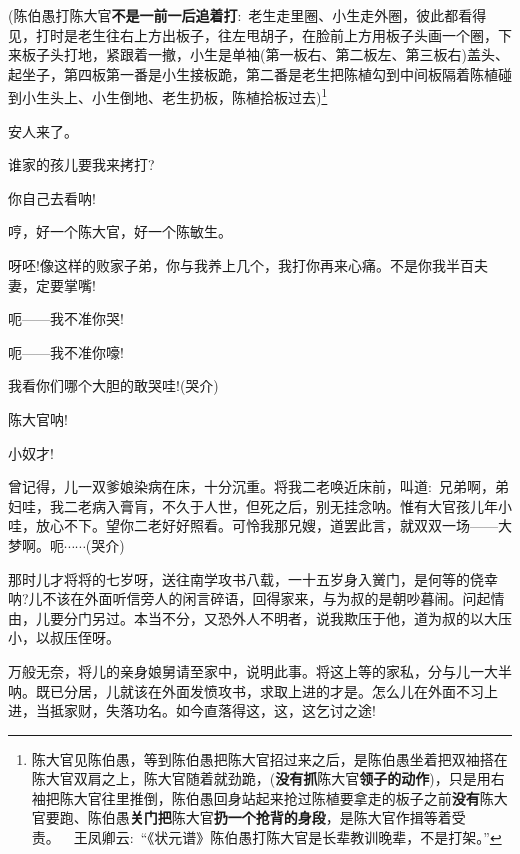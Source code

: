 {({陈伯愚{\hwfs 打}陈大官{\bfseries\hwfs 不是一前一后追着打}}:~老生{\hwfs 走里圈}、小生{\hwfs 走外圈}，{\hwfs 彼此都看得见}，{\hwfs 打时是}老生{\hwfs 往右上方出板子}，{\hwfs 往左甩胡子}，{\hwfs 在脸前上方用板子头画一个圈}，{\hwfs 下来板子头打地}，{\hwfs 紧跟着一撤}，小生{\hwfs 是单袖}({\hwfs 第一板右}、{\hwfs 第二板左}、{\hwfs 第三板右}){\hwfs 盖头}、{\hwfs 起坐子}，{\hwfs 第四板第一番是}小生{\hwfs 接板跪}，{\hwfs 第二番是}老生{\hwfs 把}陈植{\hwfs 勾到中间板隔着}陈植{\hwfs 碰到}小生{\hwfs 头上}、小生{\hwfs 倒地}、老生{\hwfs 扔板}，陈植{\hwfs 拾板过去})\footnote{陈大官{\hwfs 见}陈伯愚，{\hwfs 等到}陈伯愚{\hwfs 把}陈大官{\hwfs 招过来之后}，{\hwfs 是}陈伯愚{\hwfs 坐着把双袖搭在}陈大官{\hwfs 双肩之上}，陈大官{\hwfs 随着就劲跪}，({\bfseries\hwfs 没有抓}陈大官{\bfseries\hwfs 领子的动作})，{\hwfs 只是用右袖把}陈大官{\hwfs 往里推倒}，陈伯愚{\hwfs 回身站起来抢过}陈植{\hwfs 要拿走的板子之前}{\bfseries\hwfs 没有}陈大官{\hwfs 要跑}、陈伯愚{\bfseries\hwfs 关门把}陈大官{\bfseries\hwfs 扔一个抢背的身段}，{\hwfs 是}陈大官{\hwfs 作揖等着受责}。~~{王凤卿云:~``{\hei 《状元谱》陈伯愚打陈大官是长辈教训晚辈，不是打架。}''}}


安人来了。

谁家的孩儿要我来拷打?

你自己去看呐!

哼，好一个陈大官，好一个陈敏生。

呀呸!像这样的败家子弟，你与我养上几个，我打你再来心痛。不是你我半百夫妻，定要掌嘴!

呃------我不准你哭!

呃------我不准你嚎!

我看你们哪个大胆的敢哭哇!({\hwfs 哭介})

陈大官呐!

小奴才!

曾记得，儿一双爹娘染病在床，十分沉重。将我二老唤近床前，叫道:~兄弟啊，弟妇哇，我二老病入膏肓，不久于人世，但死之后，别无挂念呐。惟有大官孩儿年小哇，放心不下。望你二老好好照看。可怜我那兄嫂，道罢此言，就双双一场------大梦啊。呃$\cdots{}\cdots{}$({\hwfs 哭介})

那时儿才将将的七岁呀，送往南学攻书八载，一十五岁身入黉门，是何等的侥幸呐?儿不该在外面听信旁人的闲言碎语，回得家来，与为叔的是朝吵暮闹。问起情由，儿要分门另过。本当不分，又恐外人不明者，说我欺压于他，道为叔的以大压小，以叔压侄呀。

万般无奈，将儿的亲身娘舅请至家中，说明此事。将这上等的家私，分与儿一大半呐。既已分居，儿就该在外面发愤攻书，求取上进的才是。怎么儿在外面不习上进，当抵家财，失落功名。如今直落得这，这，这乞讨之途!

}
